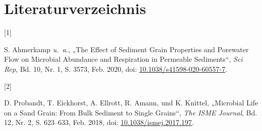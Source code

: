 \documentclass[
  ngerman,
  14pt,
  a4paper,
  DIV=11,
  twoside]{scrreprt}
\newlength{\cslhangindent}
\newlength{\csllabelwidth}
\newenvironment{CSLReferences}[2] %
 {\begin{list}{}{%
  \setlength{\itemindent}{0pt}
  \setlength{\leftmargin}{0pt}
  \setlength{\parsep}{0pt}
  \ifodd #1
   \setlength{\leftmargin}{\cslhangindent}
   \setlength{\itemindent}{-1\cslhangindent}
  \fi
  \setlength{\itemsep}{#2\baselineskip}}}
 {\end{list}}
\newcommand{\CSLLeftMargin}[1]{\parbox[t]{\csllabelwidth}{\strut#1\strut}}
\newcommand{\CSLRightInline}[1]{\parbox[t]{\linewidth - \csllabelwidth}{\strut#1\strut}}
\begin{document}

\chapter*{Literaturverzeichnis}\label{literaturverzeichnis}


\protect{}\label{refs}
\begin{CSLReferences}{0}{0}
\CSLLeftMargin{{[}1{]} }%
\CSLRightInline{S. Ahmerkamp \emph{u.~a.}, {„The Effect of Sediment
Grain Properties and Porewater Flow on Microbial Abundance and
Respiration in Permeable Sediments``}, \emph{Sci Rep}, Bd. 10, Nr. 1, S.
3573, Feb. 2020, doi:
\href{https://doi.org/10.1038/s41598-020-60557-7}{10.1038/s41598-020-60557-7}.}

\CSLLeftMargin{{[}2{]} }%
\CSLRightInline{D. Probandt, T. Eickhorst, A. Ellrott, R. Amann, und K.
Knittel, {„Microbial Life on a Sand Grain: From Bulk Sediment to Single
Grains``}, \emph{The ISME Journal}, Bd. 12, Nr. 2, S. 623--633, Feb.
2018, doi:
\href{https://doi.org/10.1038/ismej.2017.197}{10.1038/ismej.2017.197}.}

\end{CSLReferences}
\end{document}
